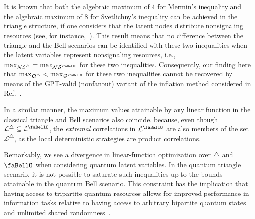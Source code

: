 \documentclass[superscriptaddress,aps,prx,nofootinbib,twocolumn,twoside,reprint,letterpaper,longbibliography]{revtex4-2}
\renewcommand{\bell}{\text{\faBellO}}
\renewcommand{\triangle}{\bigtriangleup}
\begin{document}
It is known that both the algebraic maximum of $4$ for Mermin's inequality and the algebraic maximum of $8$ for Svetlichny's inequality can be achieved in the triangle structure, if one considers that the latent nodes distribute nonsignaling resources (see, for instance,~\cite[Sec.~III~C]{TripartiteViaPR}). This result means that no difference between the triangle and the Bell scenarios can be identified with these two inequalities when the latent variables represent nonsignaling resources, i.e., $\max_{\mathcal{NS}^\triangle}=\max_{\mathcal{NS}^\bell}$ for these two inequalities. Consequently, our finding here that $\max_{\mathcal{Q}^\triangle}<\max_{\mathcal{Q}^\bell}$ for these two inequalities cannot be recovered by means of the GPT-valid (nonfanout) variant of the inflation method considered in Ref.~\citep[Sec.~V~D]{wolfe2016inflation}.

In a similar manner, the maximum values attainable by any linear function in the classical triangle and Bell scenarios also coincide, because, even though $\mathcal{L}^\triangle\subsetneq \mathcal{L}^\bell$, the \emph{extremal} correlations in $\mathcal{L}^\bell$ are also members of the set $\mathcal{L}^\triangle$, as the local deterministic strategies are product correlations.

Remarkably, we see a divergence in linear-function optimization over $\triangle$ and $\bell$ when considering quantum latent variables.
In the quantum triangle scenario, it is not possible to saturate such inequalities up to the bounds attainable in the quantum Bell scenario.
This constraint has the implication that having access to tripartite quantum resources allows for improved performance in information tasks relative to having access to arbitrary bipartite quantum states and unlimited shared randomness~\cite{navascues2020gnme}.
\end{document}
